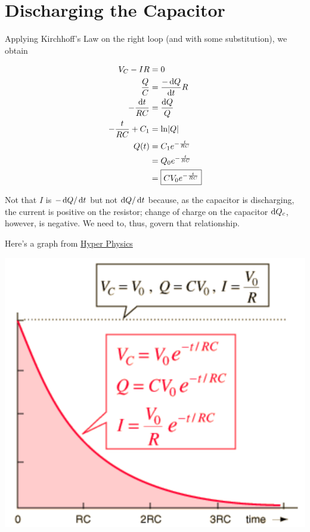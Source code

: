 \section{Discharging the Capacitor}

Applying Kirchhoff's Law on the right loop (and with some substitution), we obtain 

\begin{align*}
    V_C - IR &= 0\\
    \frac{Q}{C} &= \frac{-\dif Q}{\dif t} R\\
    -\frac{\dif t}{RC} &= \frac{\dif Q}{Q}\\
    -\frac{t}{RC} + C_1 &= \ln\abs{Q}\\
    Q(t) &= C_1 e^{-\frac{t}{RC}}\\
    &= Q_0 e^{-\frac{t}{RC}}\\
    &= \boxed{CV_0 e^{-\frac{t}{RC}}}
\end{align*}

Not that $I$ is $-\dif Q / \dif t$ but not $\dif Q / \dif t$ because, as the capacitor is discharging, the current is positive on the resistor; change of charge on the capacitor $\dif Q_c$, however, is negative. We need to, thus, govern that relationship.

Here's a graph from \href{http://hyperphysics.phy-astr.gsu.edu/hbase/hph.html}{Hyper Physics}

\begin{center}
    \includegraphics[scale=0.6]{assets/hp-c-discharging.png}
\end{center}


